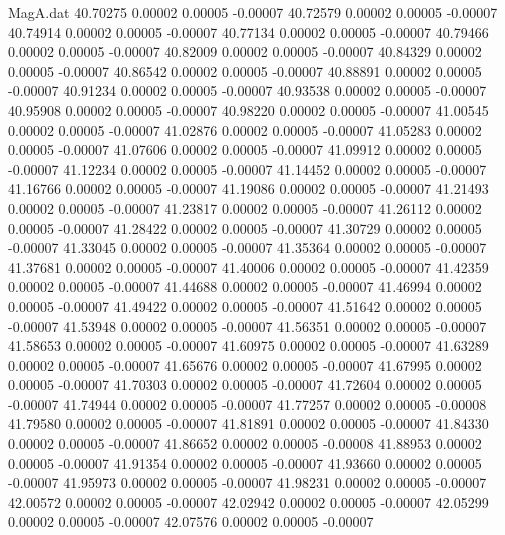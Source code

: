 \begin{filecontents}{MagA.dat}
  40.70275    0.00002    0.00005   -0.00007
  40.72579    0.00002    0.00005   -0.00007
  40.74914    0.00002    0.00005   -0.00007
  40.77134    0.00002    0.00005   -0.00007
  40.79466    0.00002    0.00005   -0.00007
  40.82009    0.00002    0.00005   -0.00007
  40.84329    0.00002    0.00005   -0.00007
  40.86542    0.00002    0.00005   -0.00007
  40.88891    0.00002    0.00005   -0.00007
  40.91234    0.00002    0.00005   -0.00007
  40.93538    0.00002    0.00005   -0.00007
  40.95908    0.00002    0.00005   -0.00007
  40.98220    0.00002    0.00005   -0.00007
  41.00545    0.00002    0.00005   -0.00007
  41.02876    0.00002    0.00005   -0.00007
  41.05283    0.00002    0.00005   -0.00007
  41.07606    0.00002    0.00005   -0.00007
  41.09912    0.00002    0.00005   -0.00007
  41.12234    0.00002    0.00005   -0.00007
  41.14452    0.00002    0.00005   -0.00007
  41.16766    0.00002    0.00005   -0.00007
  41.19086    0.00002    0.00005   -0.00007
  41.21493    0.00002    0.00005   -0.00007
  41.23817    0.00002    0.00005   -0.00007
  41.26112    0.00002    0.00005   -0.00007
  41.28422    0.00002    0.00005   -0.00007
  41.30729    0.00002    0.00005   -0.00007
  41.33045    0.00002    0.00005   -0.00007
  41.35364    0.00002    0.00005   -0.00007
  41.37681    0.00002    0.00005   -0.00007
  41.40006    0.00002    0.00005   -0.00007
  41.42359    0.00002    0.00005   -0.00007
  41.44688    0.00002    0.00005   -0.00007
  41.46994    0.00002    0.00005   -0.00007
  41.49422    0.00002    0.00005   -0.00007
  41.51642    0.00002    0.00005   -0.00007
  41.53948    0.00002    0.00005   -0.00007
  41.56351    0.00002    0.00005   -0.00007
  41.58653    0.00002    0.00005   -0.00007
  41.60975    0.00002    0.00005   -0.00007
  41.63289    0.00002    0.00005   -0.00007
  41.65676    0.00002    0.00005   -0.00007
  41.67995    0.00002    0.00005   -0.00007
  41.70303    0.00002    0.00005   -0.00007
  41.72604    0.00002    0.00005   -0.00007
  41.74944    0.00002    0.00005   -0.00007
  41.77257    0.00002    0.00005   -0.00008
  41.79580    0.00002    0.00005   -0.00007
  41.81891    0.00002    0.00005   -0.00007
  41.84330    0.00002    0.00005   -0.00007
  41.86652    0.00002    0.00005   -0.00008
  41.88953    0.00002    0.00005   -0.00007
  41.91354    0.00002    0.00005   -0.00007
  41.93660    0.00002    0.00005   -0.00007
  41.95973    0.00002    0.00005   -0.00007
  41.98231    0.00002    0.00005   -0.00007
  42.00572    0.00002    0.00005   -0.00007
  42.02942    0.00002    0.00005   -0.00007
  42.05299    0.00002    0.00005   -0.00007
  42.07576    0.00002    0.00005   -0.00007

\end{filecontents}
